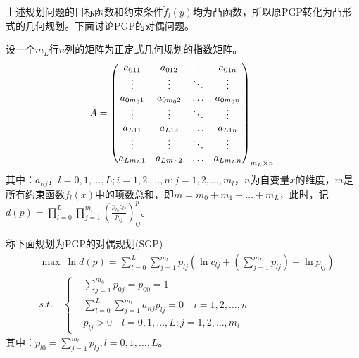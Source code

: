         \par
        上述规划问题的目标函数和约束条件${{\tilde{f}}_l(y)}$均为凸函数，所以原PGP转化为凸形式的几何规划。下面讨论PGP的对偶问题。
        \par
        设一个$m_L$行$n$列的矩阵为正定式几何规划的指数矩阵。
        \begin{equation*}
        A=\begin{pmatrix}
        a_{011}&a_{012}&\dots&a_{01n}\\
        \vdots&\vdots&\ddots&\vdots\\
        a_{0m_01}&a_{0m_02}&\dots&a_{0m_0n}\\
        \vdots&\vdots&\ddots&\vdots\\
        a_{L11}&a_{L12}&\dots&a_{L1n}\\
        \vdots&\vdots&\ddots&\vdots\\
        a_{Lm_L1}&a_{Lm_L2}&\dots&a_{Lm_Ln}
        \end{pmatrix}_{m_L\times n}\\
        \end{equation*}
        其中：$a_{lij}$，$l = 0,1,\dots,L;i=1,2,\dots,n;j=1,2,\dots,m_l$，$n$为自变量$x$的维度，$m$是所有约束函数$f_l(x)$中的项数总和，即$m=m_0+m_1+\ldots +m_L$，此时，记$d(p)=\mathop{\prod}\limits_{l=0}^{L}\mathop{\prod}\limits_{j=1}^{m_l}(\frac{p_{l_0}c_{lj}}{p_{lj}})_{lj}^p$。
        \par
        称下面规划为PGP的对偶规划(SGP)
        \begin{align*}
        &\mathop{\max}\ {\ln} d(p)=\mathop{\sum}\limits_{l=0}^{L}\mathop{\sum}\limits_{j=1}^{m_l}{p}_{lj}\left({\ln}c_{lj}+\left( \mathop{\sum}\limits_{j=1}^{m_L}p_{lj} \right) -{\ln}p_{lj}\right)\\
        &s.t.\quad \left\{
        \begin{aligned}
        &\mathop{\sum}\limits_{j=1}^{m_0}p_{0j}=p_{00}=1\\
        &\mathop{\sum}\limits_{l=0}^{L}\mathop{\sum}\limits_{j=1}^{m_l}a_{lij}p_{lj}=0\quad i = 1,2,\ldots,n\\
        &p_{lj} > 0\quad l=0,1,\ldots,L;j=1,2,\ldots,m_l
        \end{aligned}
            \right.
        \end{align*}
        其中：$p_{l0}=\mathop{\sum}\limits_{j=1}^{m_l}{p}_{lj},l=0,1,\ldots,L$。
